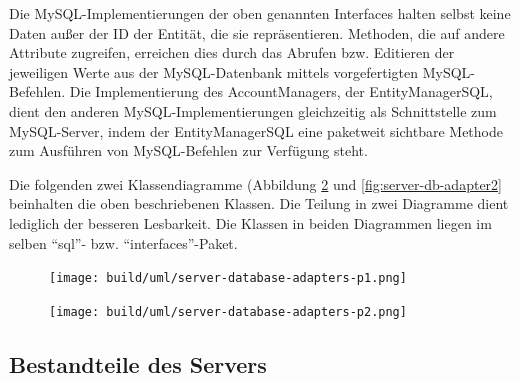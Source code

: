 \documentclass[parskip=full,11pt]{scrartcl}
\begin{document}
\par Die MySQL-Implementierungen der oben genannten Interfaces halten selbst
keine Daten außer der ID der Entität, die sie repräsentieren.
Methoden, die auf andere Attribute zugreifen, erreichen dies durch das Abrufen
bzw. Editieren der jeweiligen Werte aus der MySQL-Datenbank mittels
vorgefertigten MySQL-Befehlen.
Die Implementierung des AccountManagers, der EntityManagerSQL, dient den
anderen MySQL-Implementierungen gleichzeitig als Schnittstelle zum
MySQL-Server, indem der EntityManagerSQL eine paketweit sichtbare Methode zum
Ausführen von MySQL-Befehlen zur Verfügung steht.

\par Die folgenden zwei Klassendiagramme (Abbildung
    \ref{fig:server-db-adapter1} und \ref{fig:server-db-adapter2} beinhalten
    die oben beschriebenen Klassen.  Die Teilung in zwei Diagramme dient
    lediglich der besseren Lesbarkeit.
Die Klassen in beiden Diagrammen liegen im selben \enquote{sql}- bzw.
\enquote{interfaces}-Paket.

\begin{figure}[!htb]
    \centering
    \texttt{[image: build/uml/server-database-adapters-p1.png]}
	\label{fig:server-db-adapter1}
\end{figure}
\pagebreak

\begin{figure}[!htb]
    \centering
    \texttt{[image: build/uml/server-database-adapters-p2.png]}
	\label{fig:server-db-adapter1}
\end{figure}
\pagebreak

\subsection{Bestandteile des Servers}
\end{document}
